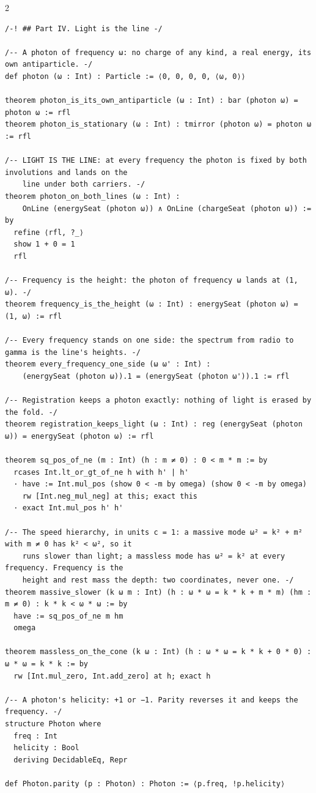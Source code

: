 \documentclass[10pt]{article}
\begin{document}
\begin{multicols}{2}
\begin{Verbatim}[fontsize=\fontsize{6.0}{6.9}\selectfont,breaklines,breakanywhere,breaksymbolleft={}]
/-! ## Part IV. Light is the line -/

/-- A photon of frequency ω: no charge of any kind, a real energy, its own antiparticle. -/
def photon (ω : Int) : Particle := ⟨0, 0, 0, 0, ⟨ω, 0⟩⟩

theorem photon_is_its_own_antiparticle (ω : Int) : bar (photon ω) = photon ω := rfl
theorem photon_is_stationary (ω : Int) : tmirror (photon ω) = photon ω := rfl

/-- LIGHT IS THE LINE: at every frequency the photon is fixed by both involutions and lands on the
    line under both carriers. -/
theorem photon_on_both_lines (ω : Int) :
    OnLine (energySeat (photon ω)) ∧ OnLine (chargeSeat (photon ω)) := by
  refine ⟨rfl, ?_⟩
  show 1 + 0 = 1
  rfl

/-- Frequency is the height: the photon of frequency ω lands at (1, ω). -/
theorem frequency_is_the_height (ω : Int) : energySeat (photon ω) = (1, ω) := rfl

/-- Every frequency stands on one side: the spectrum from radio to gamma is the line's heights. -/
theorem every_frequency_one_side (ω ω' : Int) :
    (energySeat (photon ω)).1 = (energySeat (photon ω')).1 := rfl

/-- Registration keeps a photon exactly: nothing of light is erased by the fold. -/
theorem registration_keeps_light (ω : Int) : reg (energySeat (photon ω)) = energySeat (photon ω) := rfl

theorem sq_pos_of_ne (m : Int) (h : m ≠ 0) : 0 < m * m := by
  rcases Int.lt_or_gt_of_ne h with h' | h'
  · have := Int.mul_pos (show 0 < -m by omega) (show 0 < -m by omega)
    rw [Int.neg_mul_neg] at this; exact this
  · exact Int.mul_pos h' h'

/-- The speed hierarchy, in units c = 1: a massive mode ω² = k² + m² with m ≠ 0 has k² < ω², so it
    runs slower than light; a massless mode has ω² = k² at every frequency. Frequency is the
    height and rest mass the depth: two coordinates, never one. -/
theorem massive_slower (k ω m : Int) (h : ω * ω = k * k + m * m) (hm : m ≠ 0) : k * k < ω * ω := by
  have := sq_pos_of_ne m hm
  omega

theorem massless_on_the_cone (k ω : Int) (h : ω * ω = k * k + 0 * 0) : ω * ω = k * k := by
  rw [Int.mul_zero, Int.add_zero] at h; exact h

/-- A photon's helicity: +1 or −1. Parity reverses it and keeps the frequency. -/
structure Photon where
  freq : Int
  helicity : Bool
  deriving DecidableEq, Repr

def Photon.parity (p : Photon) : Photon := ⟨p.freq, !p.helicity⟩


\end{Verbatim}
\end{multicols}
\end{document}
